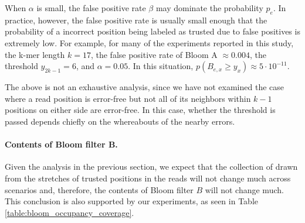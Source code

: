 \documentclass[10pt]{article}
\begin{document}
When $\alpha$ is small, the false positive rate $\beta$ may dominate the probability $p_e$.  In practice, however, the false positive rate is usually small enough that the probability of a incorrect position being labeled as trusted due to false positives is extremely low.  For example, for many of the experiments reported in this study, the k-mer length $k=17$, the false positive rate of Bloom A $\approx 0.004$, the threshold $y_{2k-1} = 6$, and $\alpha = 0.05$.  In this situation, $p(B_{e, x}\geq y_x) \approx 5 \cdot 10^{-11}.$

The above is not an exhaustive analysis, since we have not examined the case where a read position is error-free but not all of its neighbors within $k-1$ positions on either side are error-free.  In this case, whether the threshold is passed depends chiefly on the whereabouts of the nearby errors.

\paragraph{Contents of Bloom filter B.}

Given the analysis in the previous section, we expect that the collection of \kmers drawn from the stretches of trusted positions in the reads will not change much across scenarios and, therefore, the contents of Bloom filter $B$ will not change much.  This conclusion is also supported by our experiments, as seen in Table \ref{table:bloom_occupancy_coverage}.


\end{document}
